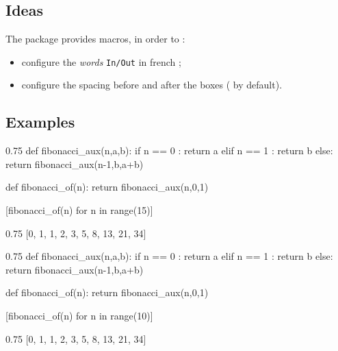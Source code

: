 \documentclass[english,11pt,a4paper]{article}
\begin{document}
\subsection{Ideas}

The package provides macros, in order to :

\begin{itemize}[itemsep=2pt]
	\item configure the \textit{words} \texttt{In/Out} in \textsf{french} ;
	\item configure the spacing before and after the boxes ( by default).
\end{itemize}

\begin{codehigh}[language=latex/latex2,style/main=cyan!10,style/code=cyan!10]


\setcounter{JupyterIn}{<nb>} %
\end{codehigh}

\subsection{Examples}

\begin{codehigh}[language=latex/latex2,style/main=cyan!10,style/code=cyan!10]
\SetJupyterParSkip{\baselineskip}
\setcounter{JupyterIn}{14}

\begin{NotebookIn}{0.75\linewidth}
def fibonacci_aux(n,a,b):
  if n == 0 :
    return a
  elif n == 1 :
    return b
  else:
    return fibonacci_aux(n-1,b,a+b)

def fibonacci_of(n):
  return fibonacci_aux(n,0,1)

[fibonacci_of(n) for n in range(15)]
\end{NotebookIn}

\begin{NotebookOut}{0.75\linewidth}
[0, 1, 1, 2, 3, 5, 8, 13, 21, 34]
\end{NotebookOut}
\end{codehigh}

\SetJupyterParSkip{\baselineskip}
\setcounter{JupyterIn}{14}

\begin{NotebookIn}{0.75\linewidth}
def fibonacci_aux(n,a,b):
	if n == 0 :
		return a
	elif n == 1 :
		return b
	else:
		return fibonacci_aux(n-1,b,a+b)

def fibonacci_of(n):
	return fibonacci_aux(n,0,1)

[fibonacci_of(n) for n in range(10)]
\end{NotebookIn}

\begin{NotebookOut}{0.75\linewidth}
[0, 1, 1, 2, 3, 5, 8, 13, 21, 34]
\end{NotebookOut}
\end{document}

